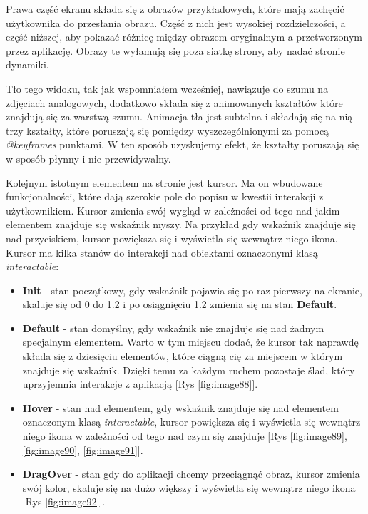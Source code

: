 Prawa część ekranu składa się z obrazów przykładowych, które mają zachęcić użytkownika do przesłania obrazu. Część z nich jest wysokiej rozdzielczości, a część niższej, aby pokazać różnicę między obrazem oryginalnym a przetworzonym przez aplikację. Obrazy te wyłamują się poza siatkę strony, aby nadać stronie dynamiki.

Tło tego widoku, tak jak wspomniałem wcześniej, nawiązuje do szumu na zdjęciach analogowych, dodatkowo składa się z animowanych kształtów które znajdują się za warstwą szumu. Animacja tła jest subtelna i składają się na nią trzy kształty, które poruszają się pomiędzy wyszczególnionymi za pomocą \textit{@keyframes} punktami. W ten sposób uzyskujemy efekt, że kształty poruszają się w sposób płynny i nie przewidywalny.

Kolejnym istotnym elementem na stronie jest kursor. Ma on wbudowane funkcjonalności, które dają szerokie pole do popisu w kwestii interakcji z użytkownikiem. Kursor zmienia swój wygląd w zależności od tego nad jakim elementem znajduje się wskaźnik myszy. Na przykład gdy wskaźnik znajduje się nad przyciskiem, kursor powiększa się i wyświetla się wewnątrz niego ikona. 
Kursor ma kilka stanów do interakcji nad obiektami oznaczonymi klasą \textit{interactable}:

\begin{itemize}
    \item \textbf{Init} - stan początkowy, gdy wskaźnik pojawia się po raz pierwszy na ekranie, skaluje się od 0 do 1.2 i po osiągnięciu 1.2 zmienia się na stan \textbf{Default}.
    \item \textbf{Default} - stan domyślny, gdy wskaźnik nie znajduje się nad żadnym specjalnym elementem. Warto w tym miejscu dodać, że kursor tak naprawdę składa się z dziesięciu elementów, które ciągną cię za miejscem w którym znajduje się wskaźnik. Dzięki temu za każdym ruchem pozostaje ślad, który uprzyjemnia interakcje z aplikacją [Rys \ref{fig:image88}].
    \item \textbf{Hover} - stan nad elementem, gdy wskaźnik znajduje się nad elementem oznaczonym klasą \textit{interactable}, kursor powiększa się i wyświetla się wewnątrz niego ikona w zależności od tego nad czym się znajduje [Rys \ref{fig:image89}, \ref{fig:image90}, \ref{fig:image91}].
    \item \textbf{DragOver} - stan gdy do aplikacji chcemy przeciągnąć obraz, kursor zmienia swój kolor, skaluje się na dużo większy i wyświetla się wewnątrz niego ikona [Rys \ref{fig:image92}].
\end{itemize}

